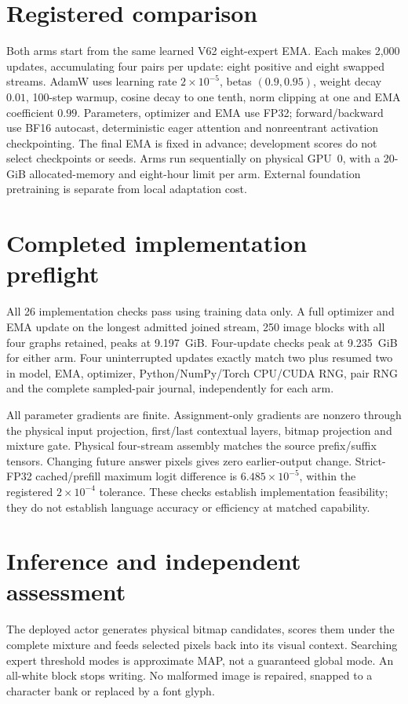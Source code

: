 \documentclass[10pt,a4paper,twocolumn]{article}
\begin{document}
\balance
\section*{Registered comparison}
Both arms start from the same learned V62 eight-expert EMA. Each makes 2,000
updates, accumulating four pairs per update: eight positive and eight swapped
streams. AdamW uses learning rate $2\!\times\!10^{-5}$, betas $(0.9,0.95)$,
weight decay $0.01$, 100-step warmup, cosine decay to one tenth, norm clipping
at one and EMA coefficient $0.99$. Parameters, optimizer and EMA use FP32;
forward/backward use BF16 autocast, deterministic eager attention and
nonreentrant activation checkpointing. The final EMA is fixed in advance;
development scores do not select checkpoints or seeds. Arms run sequentially
on physical GPU~0, with a 20-GiB allocated-memory and eight-hour limit per arm.
External foundation pretraining is separate from local adaptation cost.

\section*{Completed implementation preflight}
All 26 implementation checks pass using training data only. A full optimizer
and EMA update on the longest admitted joined stream, 250 image blocks with
all four graphs retained, peaks at 9.197~GiB. Four-update checks peak at
9.235~GiB for either arm. Four uninterrupted updates exactly match two plus
resumed two in model, EMA, optimizer, Python/NumPy/Torch CPU/CUDA RNG, pair RNG
and the complete sampled-pair journal, independently for each arm.

All parameter gradients are finite. Assignment-only gradients are nonzero
through the physical input projection, first/last contextual layers, bitmap
projection and mixture gate. Physical four-stream assembly matches the source
prefix/suffix tensors. Changing future answer pixels gives zero earlier-output
change. Strict-FP32 cached/prefill maximum logit difference is
$6.485\!\times\!10^{-5}$, within the registered $2\!\times\!10^{-4}$ tolerance.
These checks establish implementation feasibility; they do not establish
language accuracy or efficiency at matched capability.

\section*{Inference and independent assessment}
The deployed actor generates physical bitmap candidates, scores them under
the complete mixture and feeds selected pixels back into its visual context.
Searching expert threshold modes is approximate MAP, not a guaranteed global
mode. An all-white block stops writing. No malformed image is repaired,
snapped to a character bank or replaced by a font glyph.
\end{document}
